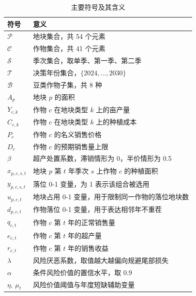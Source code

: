 \documentclass[bwprint]{gmcmthesis}
\begin{document}
\begin{table}[htbp]
\centering
\renewcommand\arraystretch{1.25}
\begin{tabular}{|p{2.6cm}|p{10.4cm}|}
  \hline
  符号    &   \quad 意义 \\
  \hline
  $\mathcal{P}$  &  地块集合，共 54 个元素  \\
  \hline
  $\mathcal{C}$  &  作物集合，共 41 个元素  \\
  \hline
  $\mathcal{S}$  &  季次集合，取单季、第一季、第二季  \\
  \hline
  $\mathcal{T}$  &  决策年份集合，$\{2024,\dots,2030\}$  \\
  \hline
  $\mathcal{B}$  &  豆类作物子集，共 8 种  \\
  \hline
  $A_p$  &  地块 $p$ 的面积  \\
  \hline
  $Y_{c,k}$  &  作物 $c$ 在地块类型 $k$ 上的亩产量  \\
  \hline
  $C_{c,k}$  &  作物 $c$ 在地块类型 $k$ 上的种植成本  \\
  \hline
  $P_c$  &  作物 $c$ 的名义销售价格  \\
  \hline
  $D_c$  &  作物 $c$ 的预期销售量上限  \\
  \hline
  $\beta$  &  超产处置系数，滞销情形为 0，半价情形为 0.5  \\
  \hline
  $x_{p,c,s,t}$  &  地块 $p$ 第 $t$ 年季次 $s$ 上作物 $c$ 的种植面积  \\
  \hline
  $y_{p,c,s,t}$  &  落位 0-1 变量，为 1 表示该组合被选用  \\
  \hline
  $u_{p,c,t}$  &  地块占用 0-1 变量，用于限制同一作物的落位地块数  \\
  \hline
  $d_{p,c,t}$  &  作物落位 0-1 变量，用于表达相邻年不重茬  \\
  \hline
  $q_{c,t}$  &  作物 $c$ 第 $t$ 年的正常销售量  \\
  \hline
  $e_{c,t}$  &  作物 $c$ 第 $t$ 年的超产量  \\
  \hline
  $r_{c,t}$  &  作物 $c$ 第 $t$ 年的销售收益  \\
  \hline
  $\lambda$  &  风险厌恶系数，取值越大越偏向规避尾部损失  \\
  \hline
  $\alpha$  &  条件风险价值的置信水平，取 0.9  \\
  \hline
  $\eta,\ \mu_t$  &  风险价值阈值与年度短缺辅助变量  \\
  \hline
\end{tabular}
\caption{主要符号及其含义}
\label{tab:symbol}
\end{table}
\end{document}
